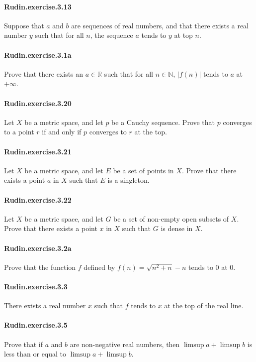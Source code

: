 \documentclass{article}
\begin{document}
\paragraph{Rudin.exercise.3.13} Suppose that $a$ and $b$ are sequences of real numbers, and that there exists a real number $y$ such that for all $n$, the sequence $a$ tends to $y$ at top $n$.

\paragraph{Rudin.exercise.3.1a} Prove that there exists an $a \in \mathbb{R}$ such that for all $n \in \mathbb{N}$, $|f(n)|$ tends to $a$ at $+\infty$.

\paragraph{Rudin.exercise.3.20} Let $X$ be a metric space, and let $p$ be a Cauchy sequence. Prove that $p$ converges to a point $r$ if and only if $p$ converges to $r$ at the top.

\paragraph{Rudin.exercise.3.21} Let $X$ be a metric space, and let $E$ be a set of points in $X$. Prove that there exists a point $a$ in $X$ such that $E$ is a singleton.

\paragraph{Rudin.exercise.3.22} Let $X$ be a metric space, and let $G$ be a set of non-empty open subsets of $X$. Prove that there exists a point $x$ in $X$ such that $G$ is dense in $X$.

\paragraph{Rudin.exercise.3.2a} Prove that the function $f$ defined by $f(n)=\sqrt{n^2+n}-n$ tends to $0$ at $0$.

\paragraph{Rudin.exercise.3.3} There exists a real number $x$ such that $f$ tends to $x$ at the top of the real line.

\paragraph{Rudin.exercise.3.5} Prove that if $a$ and $b$ are non-negative real numbers, then $\limsup a + \limsup b$ is less than or equal to $\limsup a + \limsup b$.
\end{document}
